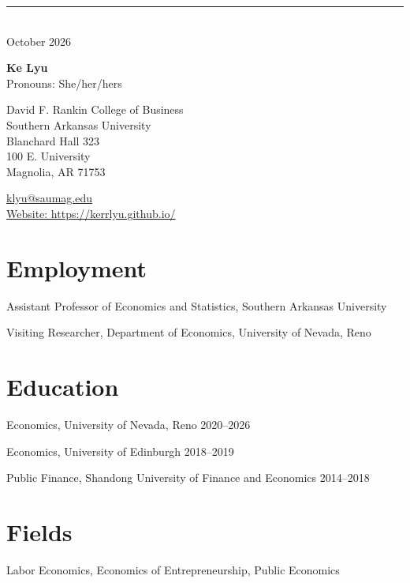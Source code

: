 \documentclass[12pt,letterpaper]{report}
\newcommand{\myname}{Ke Lyu}
\newcommand{\namefont}[1]{{\normalfont\bfseries\Huge{#1}}}
\newcommand{\listitemspace}{0.25em}
\renewenvironment{itemize}
{\begin{list}{}{\setlength{\leftmargin}{0em}
                \setlength{\parskip}{0em}
                \setlength{\itemsep}{\listitemspace}
                \setlength{\parsep}{\listitemspace}}}
{\end{list}}
\begin{document}
    \raggedright{}
    \noindent\rule{\textwidth}{0.4pt} \\ 
    \hfill October 2026 

    \namefont{\myname}\\[0.2em]
    { Pronouns: She/her/hers}

    \vspace{1em}
    \begin{minipage}[t]{0.56\textwidth}
        David F. Rankin College of Business\\
        Southern Arkansas University\\
        Blanchard Hall 323\\
        100 E. University\\
        Magnolia, AR 71753
    \end{minipage}\hfill%
    \begin{minipage}[t]{0.40\textwidth}
        \raggedleft
        \href{mailto:klyu@saumag.edu}{klyu@saumag.edu} \\
        \href{https://kerrlyu.github.io/}{Website: https://kerrlyu.github.io/}
    \end{minipage}

    \section*{Employment}
\begin{tablist} 
\item[2026--] \tab{}Assistant Professor of Economics and Statistics, Southern Arkansas University 
\item[2026--] \tab{}Visiting Researcher, Department of Economics, University of Nevada, Reno
\end{tablist}

    \section*{Education}
\begin{tablist}
  \item[Ph.D.] \tab{}Economics, University of Nevada, Reno \hfill 2020--2026
  \item[MSc]   \tab{}Economics, University of Edinburgh \hfill 2018--2019
  \item[BSc]   \tab{}Public Finance, Shandong University of Finance and Economics \hfill 2014--2018
\end{tablist}

    \section*{Fields}
    \begin{itemize}
      \item Labor Economics, Economics of Entrepreneurship, Public Economics
    \end{itemize}
    
\end{document}
